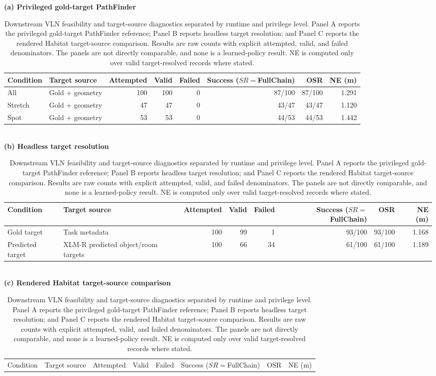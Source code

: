 \begin{table}[pos=t]
\centering
\caption{Downstream VLN feasibility and target-source diagnostics separated by runtime and privilege level. Panel A reports the privileged gold-target PathFinder reference; Panel B reports headless target resolution; and Panel C reports the rendered Habitat target-source comparison. Results are raw counts with explicit attempted, valid, and failed denominators. The panels are not directly comparable, and none is a learned-policy result. NE is computed only over valid target-resolved records where stated.}
\label{tab:vln_feasibility}
\setlength{\tabcolsep}{3.0pt}
\renewcommand{\arraystretch}{1.08}
\small
\textbf{(a) Privileged gold-target PathFinder}
\\[2pt]
\begin{tabular}{@{}p{2.7cm}p{4.3cm}rrrrrr@{}}
\hline
Condition & Target source & Attempted & Valid & Failed & \shortstack{Success\\($SR{=}$FullChain)} & OSR & NE (m) \\
\hline
All & Gold + geometry & 100 & 100 & 0 & 87/100 & 87/100 & 1.291 \\
Stretch & Gold + geometry & 47 & 47 & 0 & 43/47 & 43/47 & 1.120 \\
Spot & Gold + geometry & 53 & 53 & 0 & 44/53 & 44/53 & 1.442 \\
\hline
\end{tabular}
\\[2pt]
\textbf{(b) Headless target resolution}
\\[2pt]
\begin{tabular}{@{}p{2.7cm}p{4.3cm}rrrrrr@{}}
\hline
Condition & Target source & Attempted & Valid & Failed & \shortstack{Success\\($SR{=}$FullChain)} & OSR & NE (m) \\
\hline
Gold target & Task metadata & 100 & 99 & 1 & 93/100 & 93/100 & 1.168 \\
Predicted target & XLM-R predicted object/room targets & 100 & 66 & 34 & 61/100 & 61/100 & 1.189 \\
\hline
\end{tabular}
\\[2pt]
\textbf{(c) Rendered Habitat target-source comparison}
\\[2pt]
\begin{tabular}{@{}p{2.7cm}p{4.3cm}rrrrrr@{}}
\hline
Condition & Target source & Attempted & Valid & Failed & \shortstack{Success\\($SR{=}$FullChain)} & OSR & NE (m) \\

\end{tabular}
\end{table}
